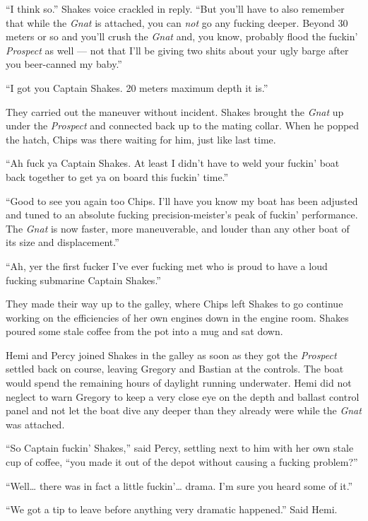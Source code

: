 \documentclass[
]{scrbook}
\begin{document}
``I think so.'' Shakes voice crackled in reply. ``But you'll have to
also remember that while the \emph{Gnat} is attached, you can \emph{not}
go any fucking deeper. Beyond 30 meters or so and you'll crush the
\emph{Gnat} and, you know, probably flood the fuckin' \emph{Prospect} as
well --- not that I'll be giving two shits about your ugly barge after
you beer-canned my baby.''

``I got you Captain Shakes. 20 meters maximum depth it is.''

They carried out the maneuver without incident. Shakes brought the
\emph{Gnat} up under the \emph{Prospect} and connected back up to the
mating collar. When he popped the hatch, Chips was there waiting for
him, just like last time.

``Ah fuck ya Captain Shakes. At least I didn't have to weld your fuckin'
boat back together to get ya on board this fuckin' time.''

``Good to see you again too Chips. I'll have you know my boat has been
adjusted and tuned to an absolute fucking precision-meister's peak of
fuckin' performance. The \emph{Gnat} is now faster, more maneuverable,
and louder than any other boat of its size and displacement.''

``Ah, yer the first fucker I've ever fucking met who is proud to have a
loud fucking submarine Captain Shakes.''

They made their way up to the galley, where Chips left Shakes to go
continue working on the efficiencies of her own engines down in the
engine room. Shakes poured some stale coffee from the pot into a mug and
sat down.

Hemi and Percy joined Shakes in the galley as soon as they got the
\emph{Prospect} settled back on course, leaving Gregory and Bastian at
the controls. The boat would spend the remaining hours of daylight
running underwater. Hemi did not neglect to warn Gregory to keep a very
close eye on the depth and ballast control panel and not let the boat
dive any deeper than they already were while the \emph{Gnat} was
attached.

``So Captain fuckin' Shakes,'' said Percy, settling next to him with her
own stale cup of coffee, ``you made it out of the depot without causing
a fucking problem?''

``Well\ldots{} there was in fact a little fuckin'\ldots{} drama. I'm
sure you heard some of it.''

``We got a tip to leave before anything very dramatic happened.'' Said
Hemi.
\end{document}
